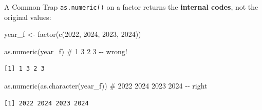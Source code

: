 \documentclass[
  ignorenonframetext,
  aspectratio=169,
]{beamer}
\newenvironment{Shaded}{\begin{snugshade}}{\end{snugshade}}
\newcommand{\CommentTok}[1]{\textcolor[rgb]{0.37,0.37,0.37}{#1}}
\newcommand{\DecValTok}[1]{\textcolor[rgb]{0.68,0.00,0.00}{#1}}
\newcommand{\FunctionTok}[1]{\textcolor[rgb]{0.28,0.35,0.67}{#1}}
\newcommand{\NormalTok}[1]{\textcolor[rgb]{0.00,0.23,0.31}{#1}}
\newcommand{\OtherTok}[1]{\textcolor[rgb]{0.00,0.23,0.31}{#1}}
\begin{document}
\begin{frame}[fragile]{A Common Trap}
\protect\hypertarget{a-common-trap}{}
\texttt{as.numeric()} on a factor returns the \textbf{internal codes},
not the original values:

\begin{Shaded}
\begin{Highlighting}[]
\NormalTok{year\_f }\OtherTok{\textless{}{-}} \FunctionTok{factor}\NormalTok{(}\FunctionTok{c}\NormalTok{(}\DecValTok{2022}\NormalTok{, }\DecValTok{2024}\NormalTok{, }\DecValTok{2023}\NormalTok{, }\DecValTok{2024}\NormalTok{))}

\FunctionTok{as.numeric}\NormalTok{(year\_f)                 }\CommentTok{\# 1 3 2 3 {-}{-} wrong!}
\end{Highlighting}
\end{Shaded}

\begingroup\tiny\color{darkgray}

\begin{verbatim}
[1] 1 3 2 3
\end{verbatim}

\endgroup

\begin{Shaded}
\begin{Highlighting}[]
\FunctionTok{as.numeric}\NormalTok{(}\FunctionTok{as.character}\NormalTok{(year\_f))   }\CommentTok{\# 2022 2024 2023 2024 {-}{-} right}
\end{Highlighting}
\end{Shaded}

\begingroup\tiny\color{darkgray}

\begin{verbatim}
[1] 2022 2024 2023 2024
\end{verbatim}

\endgroup
\end{frame}
\end{document}
